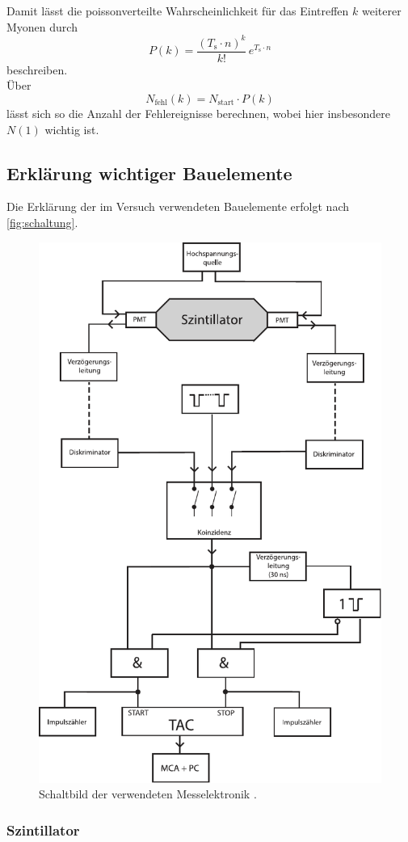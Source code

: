 Damit lässt die poissonverteilte Wahrscheinlichkeit für das Eintreffen $k$ weiterer Myonen durch
\begin{equation*}
    P(k) = \frac{(T_\text{s} \cdot n)^k}{k!} \, e^{T_\text{s} \cdot n}
\end{equation*}
beschreiben. \\

Über
\begin{equation*}
    N_\text{fehl} (k) = N_\text{start} \cdot P(k)
\end{equation*}
lässt sich so die Anzahl der Fehlereignisse berechnen, wobei hier insbesondere $N(1)$ wichtig ist.

\newpage

\subsection{Erklärung wichtiger Bauelemente}

Die Erklärung der im Versuch verwendeten Bauelemente erfolgt nach \autoref{fig:schaltung}.

\begin{figure}[H]
    \centering
    \includegraphics[width=.6\textwidth]{figures/V01.pdf}
    \caption{Schaltbild der verwendeten Messelektronik \cite{ap03}.}
    \label{fig:schaltung}
\end{figure}

\subsubsection{Szintillator}


